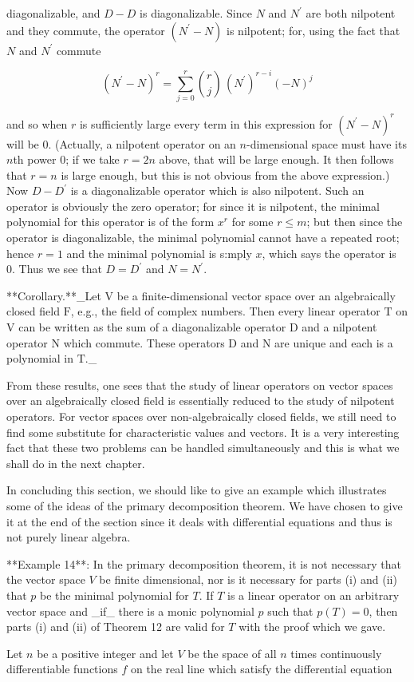 diagonalizable, and \(D-D\) is diagonalizable. Since \(N\) and \(N^{\prime}\) are both nilpotent and they commute, the operator \((N^{\prime}-N)\) is nilpotent; for, using the fact that \(N\) and \(N^{\prime}\) commute

\[(N^{\prime}-N)^{r}=\sum_{j=0}^{r}\binom{r}{j}\,(N^{\prime})^{r-i}(-N)^{j}\]

and so when \(r\) is sufficiently large every term in this expression for \((N^{\prime}-N)^{r}\) will be 0. (Actually, a nilpotent operator on an \(n\)-dimensional space must have its \(n\)th power 0; if we take \(r=2n\) above, that will be large enough. It then follows that \(r=n\) is large enough, but this is not obvious from the above expression.) Now \(D-D^{\prime}\) is a diagonalizable operator which is also nilpotent. Such an operator is obviously the zero operator; for since it is nilpotent, the minimal polynomial for this operator is of the form \(x^{r}\) for some \(r\leq m\); but then since the operator is diagonalizable, the minimal polynomial cannot have a repeated root; hence \(r=1\) and the minimal polynomial is s:mply \(x\), which says the operator is 0. Thus we see that \(D=D^{\prime}\) and \(N=N^{\prime}\).

**Corollary.**_Let \(\mathrm{V}\) be a finite-dimensional vector space over an algebraically closed field \(\mathrm{F}\), e.g., the field of complex numbers. Then every linear operator \(\mathrm{T}\) on \(\mathrm{V}\) can be written as the sum of a diagonalizable operator \(\mathrm{D}\) and a nilpotent operator \(\mathrm{N}\) which commute. These operators \(\mathrm{D}\) and \(\mathrm{N}\) are unique and each is a polynomial in \(\mathrm{T}\)._

From these results, one sees that the study of linear operators on vector spaces over an algebraically closed field is essentially reduced to the study of nilpotent operators. For vector spaces over non-algebraically closed fields, we still need to find some substitute for characteristic values and vectors. It is a very interesting fact that these two problems can be handled simultaneously and this is what we shall do in the next chapter.

In concluding this section, we should like to give an example which illustrates some of the ideas of the primary decomposition theorem. We have chosen to give it at the end of the section since it deals with differential equations and thus is not purely linear algebra.

**Example 14**: In the primary decomposition theorem, it is not necessary that the vector space \(V\) be finite dimensional, nor is it necessary for parts (i) and (ii) that \(p\) be the minimal polynomial for \(T\). If \(T\) is a linear operator on an arbitrary vector space and _if_ there is a monic polynomial \(p\) such that \(p(T)=0\), then parts (i) and (ii) of Theorem 12 are valid for \(T\) with the proof which we gave.

Let \(n\) be a positive integer and let \(V\) be the space of all \(n\) times continuously differentiable functions \(f\) on the real line which satisfy the differential equation 